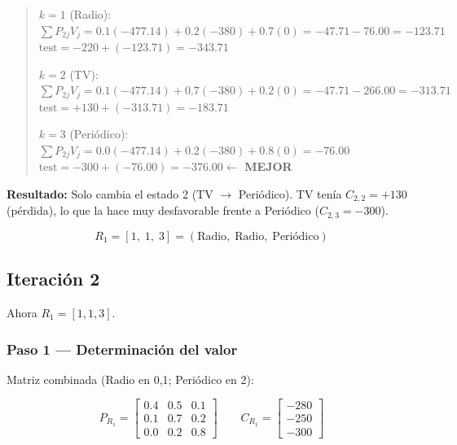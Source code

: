 \documentclass[12pt,a4paper]{article}
\begin{document}
\begin{quote}\footnotesize
$k=1$ (Radio):\;
$\sum P_{2j}V_j = 0.1(-477.14) + 0.2(-380) + 0.7(0) = -47.71 - 76.00 = -123.71$ \\
\hspace*{1.8cm} $\text{test} = -220 + (-123.71) = -343.71$

\vspace{4pt}
$k=2$ (TV):\;
$\sum P_{2j}V_j = 0.1(-477.14) + 0.7(-380) + 0.2(0) = -47.71 - 266.00 = -313.71$ \\
\hspace*{1.8cm} $\text{test} = +130 + (-313.71) = -183.71$

\vspace{4pt}
$k=3$ (Periódico):\;
$\sum P_{2j}V_j = 0.0(-477.14) + 0.2(-380) + 0.8(0) = -76.00$ \\
\hspace*{1.8cm} $\text{test} = -300 + (-76.00) = \mathbf{-376.00}$\quad $\leftarrow$ \textbf{MEJOR}
\end{quote}

\vspace{0.3cm}
\textbf{Resultado:} Solo cambia el estado 2 (TV $\to$ Periódico). TV tenía $C_{2,2}=+130$ (pérdida), lo que la hace muy desfavorable frente a Periódico ($C_{2,3}=-300$).

\[
\boxed{ R_1 = [1,\; 1,\; 3] = (\text{Radio},\; \text{Radio},\; \text{Periódico}) }
\]

\newpage

\subsection*{Iteración 2}

Ahora $R_1 = [1, 1, 3]$.

\subsubsection*{Paso 1 --- Determinación del valor}

Matriz combinada (Radio en 0,1; Periódico en 2):

\[
P_{R_1} = \begin{bmatrix}
0.4 & 0.5 & 0.1 \\
0.1 & 0.7 & 0.2 \\
0.0 & 0.2 & 0.8
\end{bmatrix}
\qquad
C_{R_1} = \begin{bmatrix} -280 \\ -250 \\ -300 \end{bmatrix}
\]
\end{document}
